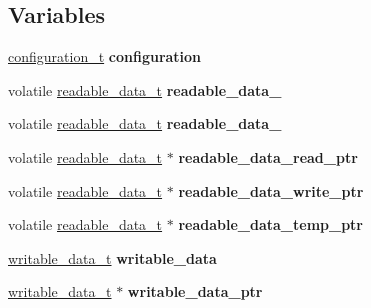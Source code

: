 \subsection*{Variables}
\begin{DoxyCompactItemize}
\item 
\mbox{\label{i2c-th_8h_a2de2634e2a016686a774342d2a88c337}} 
\hyperlink{structconfiguration__t}{configuration\+\_\+t} {\bfseries configuration}
\item 
\mbox{\label{i2c-th_8h_afd53572545d57eace164200d778d0a9d}} 
volatile \hyperlink{structreadable__data__t}{readable\+\_\+data\+\_\+t} {\bfseries readable\+\_\+data\+\_}
\item 
\mbox{\label{i2c-th_8h_ab991d3a2cbae41335c5d7d4e89244cd1}} 
volatile \hyperlink{structreadable__data__t}{readable\+\_\+data\+\_\+t} {\bfseries readable\+\_\+data\+\_}
\item 
\mbox{\label{i2c-th_8h_a116a8c30b5e09aba7f576e28306198bf}} 
volatile \hyperlink{structreadable__data__t}{readable\+\_\+data\+\_\+t} $\ast$ {\bfseries readable\+\_\+data\+\_\+read\+\_\+ptr}
\item 
\mbox{\label{i2c-th_8h_ae4373e69a329e351562eb42a1c727c9f}} 
volatile \hyperlink{structreadable__data__t}{readable\+\_\+data\+\_\+t} $\ast$ {\bfseries readable\+\_\+data\+\_\+write\+\_\+ptr}
\item 
\mbox{\label{i2c-th_8h_ae366599d9d4af3d37700b6c9afe41cd7}} 
volatile \hyperlink{structreadable__data__t}{readable\+\_\+data\+\_\+t} $\ast$ {\bfseries readable\+\_\+data\+\_\+temp\+\_\+ptr}
\item 
\mbox{\label{i2c-th_8h_a94a54440e8d793279d3f9a452df185fb}} 
\hyperlink{structwritable__data__t}{writable\+\_\+data\+\_\+t} {\bfseries writable\+\_\+data}
\item 
\mbox{\label{i2c-th_8h_a627231af37de36321ae22848113458e3}} 
\hyperlink{structwritable__data__t}{writable\+\_\+data\+\_\+t} $\ast$ {\bfseries writable\+\_\+data\+\_\+ptr}
\item 
\mbox{\label{i2c-th_8h_a5d82bd60e64bb04ee872ce02b04f6cb3}} 

\end{DoxyCompactItemize}
